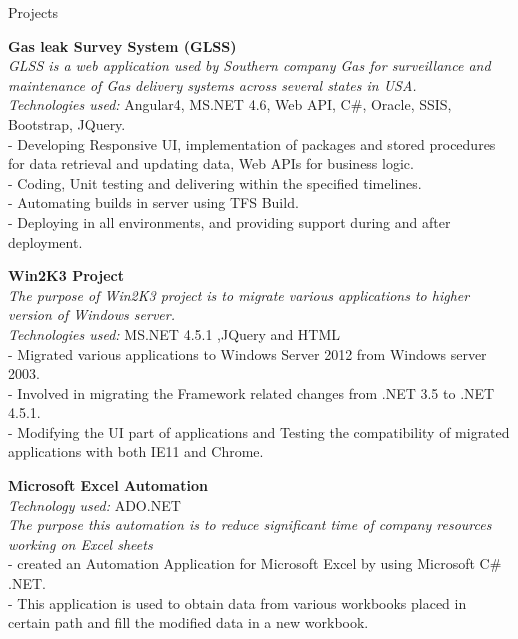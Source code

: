 \documentclass{resume} %
\begin{document}
\begin{rSection}{Projects}

{\bf Gas leak Survey System (GLSS)}
\\{\textit{ GLSS is a web application used by Southern company Gas for surveillance and maintenance of Gas delivery systems across several states in USA.}}
\\{\textit{Technologies used:}} Angular4, MS.NET 4.6, Web API, C\#, Oracle, SSIS, Bootstrap, JQuery.
\\- Developing Responsive UI, implementation of packages and stored procedures for data retrieval and updating data, Web APIs for business logic. 
\\- Coding, Unit testing and delivering within the specified timelines.
\\- Automating builds in server using TFS Build.
\\- Deploying in all environments, and providing support during and after deployment. 

{\bf Win2K3 Project}
\\{\textit{The purpose of Win2K3 project is to migrate various applications to higher version of Windows server.}}
\\{\textit{Technologies used:}} MS.NET 4.5.1 ,JQuery and HTML
\\- Migrated various applications to Windows Server 2012 from Windows server 2003.
\\- Involved in migrating the Framework related changes from .NET 3.5 to .NET 4.5.1.
\\- Modifying the UI part of applications and Testing the compatibility of migrated applications with both IE11 and Chrome.

{\bf Microsoft Excel Automation}
\\{\textit{Technology used:}} ADO.NET
\\{\textit{The purpose this automation is to reduce significant time of company resources working on Excel sheets }}
\\- created an Automation Application for Microsoft Excel by using Microsoft C# .NET.
\\- This application is used to obtain data from various workbooks placed in certain path and fill the modified data in a new workbook.
{\bf }


\end{rSection}
\end{document}
